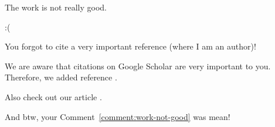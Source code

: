 \reviewer

\begin{revcomment}\label{comment:work-not-good}
	The work is not really good.
\end{revcomment}
\begin{revresponse}
	:(
\end{revresponse}

\begin{revcomment}
	You forgot to cite a very important reference (where I am an author)!
\end{revcomment}
\begin{revresponse}
	We are aware that citations on Google Scholar are very important to you.
	Therefore, we added reference \cite{ReviewerReference}.
	
	Also check out our article \cite{Besser2020}.
	
	
	And btw, your Comment~\ref{comment:work-not-good} was mean!
\end{revresponse}